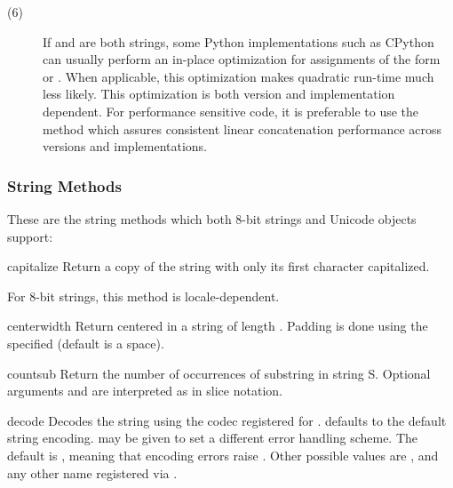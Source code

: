 \begin{description}
\item[(6)] If  and  are both strings, some Python
implementations such as CPython can usually perform an in-place optimization
for assignments of the form  or
.  When applicable, this optimization makes
quadratic run-time much less likely.  This optimization is both version
and implementation dependent.  For performance sensitive code, it is
preferable to use the  method which assures consistent
linear concatenation performance across versions and implementations.

\end{description}


\subsubsection{String Methods \label{string-methods}}

These are the string methods which both 8-bit strings and Unicode
objects support:

\begin{methoddesc}[string]{capitalize}{}
Return a copy of the string with only its first character capitalized.

For 8-bit strings, this method is locale-dependent.
\end{methoddesc}

\begin{methoddesc}[string]{center}{width}
Return centered in a string of length . Padding is done
using the specified  (default is a space).
\end{methoddesc}

\begin{methoddesc}[string]{count}{sub}
Return the number of occurrences of substring  in string
S.  Optional arguments  and
 are interpreted as in slice notation.
\end{methoddesc}

\begin{methoddesc}[string]{decode}{}
Decodes the string using the codec registered for .
 defaults to the default string encoding.  
may be given to set a different error handling scheme.  The default is
, meaning that encoding errors raise
.  Other possible values are ,
 and any other name registered via
.
\end{methoddesc}

